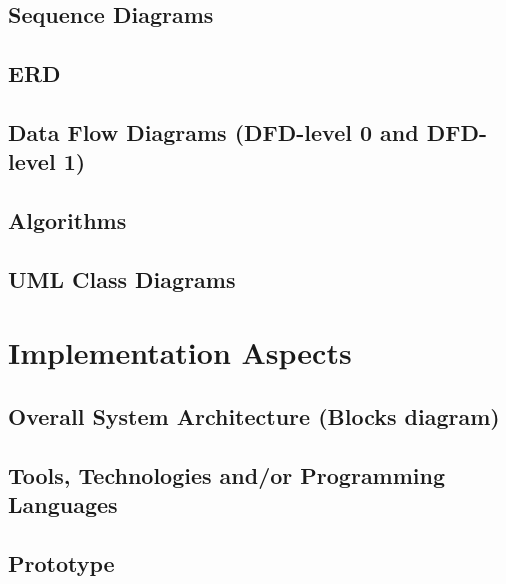 \documentclass{book}
\begin{document}
		\section{Sequence Diagrams}
		
		\section{ERD}
		
		\section{Data Flow Diagrams (DFD-level 0 and DFD-level 1)}
		
		\section{Algorithms}
		
		\section{UML Class Diagrams}
	
	\chapter{Implementation Aspects}
		\section{Overall System Architecture (Blocks diagram)}
		
		\section{Tools, Technologies and/or Programming Languages}
		
		\section{Prototype}
	
\end{document}
